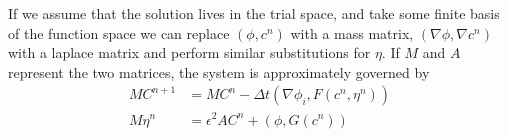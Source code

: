 \documentclass{article}
\begin{document}
If we assume that the solution lives in the trial space, and take some finite
basis of the function space we can replace $(\phi, c^{n})$ with a mass matrix,
$(\nabla \phi, \nabla c^n)$ with a laplace matrix and perform similar
substitutions for $\eta$. If $M$ and $A$ represent the two matrices, the system
is approximately governed by
\begin{align}
    MC^{n+1} &= MC^n - \Delta t (\nabla \phi_i, F(c^n, \eta^n))\\
    M\eta^n &= \epsilon^2 A C^n + (\phi, G(c^n))
\end{align}
\end{document}
